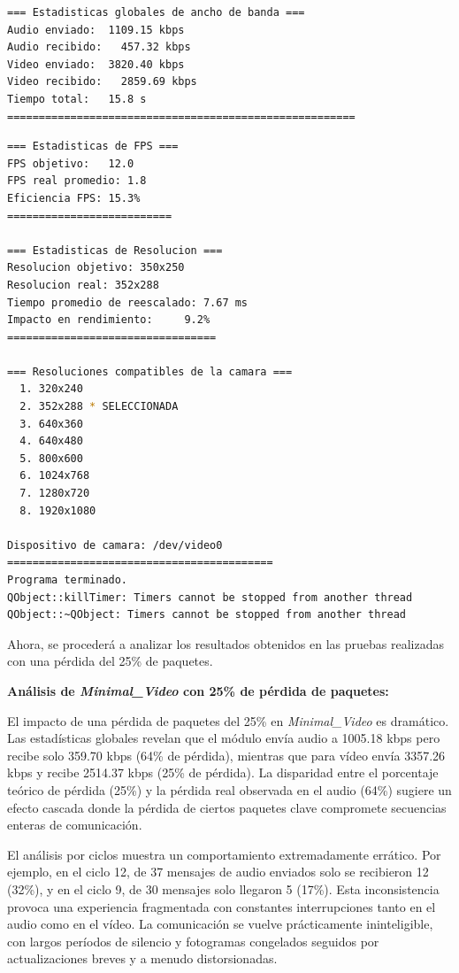 \begin{lstlisting}[language=bash,basicstyle=\ttfamily\scriptsize]
=== Estadisticas globales de ancho de banda ===
Audio enviado:	1109.15 kbps
Audio recibido:   457.32 kbps
Video enviado:	3820.40 kbps
Video recibido:   2859.69 kbps
Tiempo total: 	15.8 s
=======================================================
\end{lstlisting}

\begin{lstlisting}[language=bash,basicstyle=\ttfamily\scriptsize]
=== Estadisticas de FPS ===
FPS objetivo: 	12.0
FPS real promedio: 1.8
Eficiencia FPS:	15.3%
==========================

=== Estadisticas de Resolucion ===
Resolucion objetivo: 350x250
Resolucion real: 352x288
Tiempo promedio de reescalado: 7.67 ms
Impacto en rendimiento:    	9.2%
=================================

=== Resoluciones compatibles de la camara ===
  1. 320x240
  2. 352x288 * SELECCIONADA
  3. 640x360
  4. 640x480
  5. 800x600
  6. 1024x768
  7. 1280x720
  8. 1920x1080

Dispositivo de camara: /dev/video0
==========================================
Programa terminado.
QObject::killTimer: Timers cannot be stopped from another thread
QObject::~QObject: Timers cannot be stopped from another thread
\end{lstlisting}

\newpage

Ahora, se procederá a analizar los resultados obtenidos en las pruebas realizadas con una pérdida del 25\% de paquetes.
\vspace{\baselineskip}

\textbf{Análisis de \textit{Minimal\_Video} con 25\% de pérdida de paquetes:}
\vspace{\baselineskip}

El impacto de una pérdida de paquetes del 25\% en \textit{Minimal\_Video} es dramático. Las estadísticas globales revelan que el módulo envía audio a 1005.18 kbps pero recibe solo 359.70 kbps (64\% de pérdida), mientras que para vídeo envía 3357.26 kbps y recibe 2514.37 kbps (25\% de pérdida). La disparidad entre el porcentaje teórico de pérdida (25\%) y la pérdida real observada en el audio (64\%) sugiere un efecto cascada donde la pérdida de ciertos paquetes clave compromete secuencias enteras de comunicación.
\vspace{\baselineskip}

El análisis por ciclos muestra un comportamiento extremadamente errático. Por ejemplo, en el ciclo 12, de 37 mensajes de audio enviados solo se recibieron 12 (32\%), y en el ciclo 9, de 30 mensajes solo llegaron 5 (17\%). Esta inconsistencia provoca una experiencia fragmentada con constantes interrupciones tanto en el audio como en el vídeo. La comunicación se vuelve prácticamente ininteligible, con largos períodos de silencio y fotogramas congelados seguidos por actualizaciones breves y a menudo distorsionadas.


